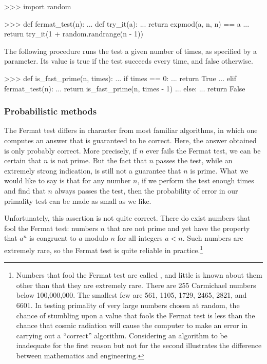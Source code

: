 \begin{codeBlock}
>>> import random

>>> def fermat_test(n):
...     def try_it(a):
...         return expmod(a, n, n) == a
...     return try_it(1 + random.randrange(n - 1))
\end{codeBlock}

\noindent
The following procedure runs the test a given number of times, as specified by
a parameter.  Its value is true if the test succeeds every time, and false
otherwise.

\begin{codeBlock}
>>> def is_fast_prime(n, times):
...     if times == 0:
...         return True
...     elif fermat_test(n):
...         return is_fast_prime(n, times - 1)
...     else:
...         return False
\end{codeBlock}

\subsubsection*{Probabilistic methods}

The Fermat test differs in character from most familiar algorithms, in which
one computes an answer that is guaranteed to be correct.  Here, the answer
obtained is only probably correct.  More precisely, if \( n \) ever fails the
Fermat test, we can be certain that \( n \) is not prime.  But the fact that
\( n \) passes the test, while an extremely strong indication, is still not a
guarantee that \( n \) is prime.  What we would like to say is that for any
number \( n \), if we perform the test enough times and find that \( n \) always
passes the test, then the probability of error in our primality test can be
made as small as we like.

Unfortunately, this assertion is not quite correct.  There do exist numbers
that fool the Fermat test: numbers \( n \) that are not prime and yet have the
property that \( a^n \) is congruent to \( a \) modulo \( n \) for all integers
\( a < n \).  Such numbers are extremely rare, so the Fermat test is quite
reliable in practice.\footnote{\label{Footnote 1.47} Numbers
that fool the Fermat test are called , and little
is known about them other than that they are extremely rare.  There are 255
Carmichael numbers below 100,000,000.  The smallest few are 561, 1105, 1729,
2465, 2821, and 6601.  In testing primality of very large numbers chosen at
random, the chance of stumbling upon a value that fools the Fermat test is less
than the chance that cosmic radiation will cause the computer to make an error
in carrying out a ``correct'' algorithm.  Considering an algorithm to be
inadequate for the first reason but not for the second illustrates the
difference between mathematics and engineering.}

